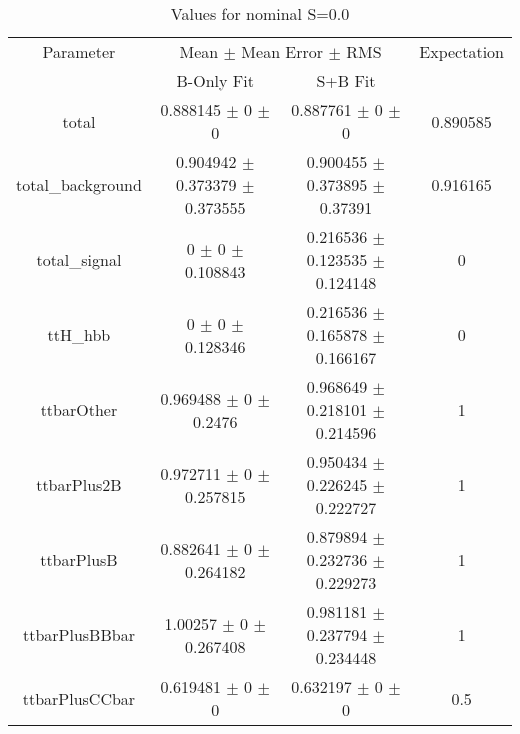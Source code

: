 \begin{table}
\centering
\caption{Values for nominal S=0.0}
\begin{tabular}{cccc}
\toprule
Parameter & \multicolumn{2}{c}{Mean $\pm$ Mean Error $\pm$ RMS} & Expectation\\
 & B-Only Fit & S+B Fit & \\
\midrule
total & \num{0.888145} $\pm$ \num{0} $\pm$ \num{0} & \num{0.887761} $\pm$ \num{0} $\pm$ \num{0} & \num{0.890585}\\
total\_background & \num{0.904942} $\pm$ \num{0.373379} $\pm$ \num{0.373555} & \num{0.900455} $\pm$ \num{0.373895} $\pm$ \num{0.37391} & \num{0.916165}\\
total\_signal & \num{0} $\pm$ \num{0} $\pm$ \num{0.108843} & \num{0.216536} $\pm$ \num{0.123535} $\pm$ \num{0.124148} & \num{0}\\
ttH\_hbb & \num{0} $\pm$ \num{0} $\pm$ \num{0.128346} & \num{0.216536} $\pm$ \num{0.165878} $\pm$ \num{0.166167} & \num{0}\\
ttbarOther & \num{0.969488} $\pm$ \num{0} $\pm$ \num{0.2476} & \num{0.968649} $\pm$ \num{0.218101} $\pm$ \num{0.214596} & \num{1}\\
ttbarPlus2B & \num{0.972711} $\pm$ \num{0} $\pm$ \num{0.257815} & \num{0.950434} $\pm$ \num{0.226245} $\pm$ \num{0.222727} & \num{1}\\
ttbarPlusB & \num{0.882641} $\pm$ \num{0} $\pm$ \num{0.264182} & \num{0.879894} $\pm$ \num{0.232736} $\pm$ \num{0.229273} & \num{1}\\
ttbarPlusBBbar & \num{1.00257} $\pm$ \num{0} $\pm$ \num{0.267408} & \num{0.981181} $\pm$ \num{0.237794} $\pm$ \num{0.234448} & \num{1}\\
ttbarPlusCCbar & \num{0.619481} $\pm$ \num{0} $\pm$ \num{0} & \num{0.632197} $\pm$ \num{0} $\pm$ \num{0} & \num{0.5}\\
\bottomrule
\end{tabular}
\end{table}